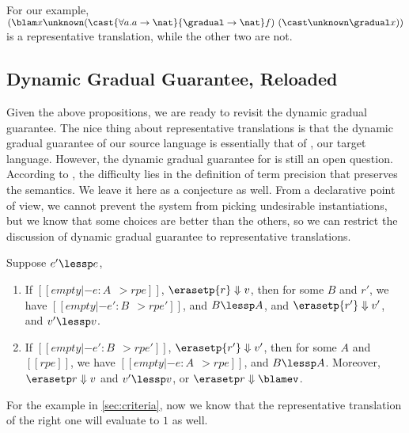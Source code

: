 For our example, $(\blam x \unknown (\cast {\forall a. a \to \nat} {\gradual \to
  \nat} f) ~ (\cast \unknown \gradual x))$ is a representative translation,
while the other two are not.


\subsection{Dynamic Gradual Guarantee, Reloaded}

Given the above propositions, we are ready to revisit the dynamic gradual
guarantee. The nice thing about representative translations is that the
dynamic gradual guarantee of our source language is essentially that of \pbc,
our target language. However, the dynamic gradual guarantee for \pbc is still an
open question. According to \citet{yuu2017poly}, the difficulty lies in the
definition of term precision that preserves the semantics. We leave it here as a
conjecture as well. From a declarative point of view, we cannot prevent the
system from picking undesirable instantiations, but we know that some choices
are better than the others, so we can restrict the discussion of dynamic gradual
guarantee to representative translations.

\begin{conjecture}
  Suppose $e' \lessp e$,
  \begin{enumerate}
  \item If $[[empty |- e : A ~~> rpe]]$, $\erasetp {r} \Downarrow v$,
    then for some $B$ and $r'$, we have $[[ empty |- e' : B ~~> rpe']]$,
    and $B \lessp A$,
    and $\erasetp {r'} \Downarrow v'$,
    and $v' \lessp v$.
  \item If $[[empty |- e' : B ~~> rpe']]$, $\erasetp {r'} \Downarrow v'$,
    then for some $A$ and $[[rpe]]$, we have $ [[empty |- e : A ~~> rpe]]$,
    and $B \lessp A$. Moreover,
    $\erasetp r \Downarrow v$ and $v' \lessp v$,
    or $\erasetp r \Downarrow \blamev$.
  \end{enumerate}
\end{conjecture}

For the example in \cref{sec:criteria}, now we know that the representative
translation of the right one will evaluate to $1$ as well.

